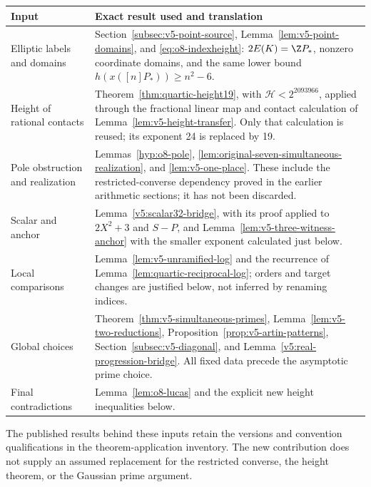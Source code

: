 \begin{center}\small
\begin{tabular}{p{}p{}}
\toprule
Input & Exact result used and translation\\\midrule
Elliptic labels and domains & Section~\ref{subsec:v5-point-source},
Lemma~\ref{lem:v5-point-domains}, and \eqref{eq:o8-indexheight}:
$2E(K)=\Z P_*$, nonzero coordinate domains, and the same lower bound
$h(x([n]P_*))\ge n^2-6$.\\
Height of rational contacts & Theorem~\ref{thm:quartic-height19},
with $\mathcal H<2^{2093966}$, applied through the fractional linear
map and contact calculation of Lemma~\ref{lem:v5-height-transfer}.
Only that calculation is reused; its exponent 24 is replaced by 19.\\
Pole obstruction and realization & Lemmas~\ref{hyp:o8-pole},
\ref{lem:original-seven-simultaneous-realization}, and
\ref{lem:v5-one-place}. These include the restricted-converse dependency
proved in the earlier arithmetic sections; it has not been discarded.\\
Scalar and anchor & Lemma~\ref{v5:scalar32-bridge}, with its proof
applied to $2X^2+3$ and $S-P$, and
Lemma~\ref{lem:v5-three-witness-anchor} with the smaller exponent
calculated just below.\\
Local comparisons & Lemma~\ref{lem:v5-unramified-log} and the
recurrence of Lemma~\ref{lem:quartic-reciprocal-log}; orders and
target changes are justified below, not inferred by renaming indices.\\
Global choices & Theorem~\ref{thm:v5-simultaneous-primes},
Lemma~\ref{lem:v5-two-reductions}, Proposition~\ref{prop:v5-artin-patterns},
Section~\ref{subsec:v5-diagonal}, and
Lemma~\ref{v5:real-progression-bridge}. All fixed data precede the
asymptotic prime choice.\\
Final contradictions & Lemma~\ref{lem:o8-lucas} and the explicit
new height inequalities below.\\\bottomrule
\end{tabular}
\end{center}

The published results behind these inputs retain the versions and
convention qualifications in the theorem-application inventory. The new
contribution does not supply an assumed replacement for the restricted
converse, the height theorem, or the Gaussian prime argument.

